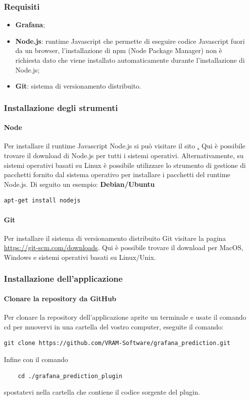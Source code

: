\subsubsection{Requisiti}
\begin{itemize}
	\item \textbf{Grafana\glo};
	\item \textbf{Node.js}: runtime Javascript che permette di eseguire codice Javascript fuori da un browser, l'installazione di npm (Node Package Manager) non è richiesta dato che viene installato automaticamente durante l'installazione di Node.js;
	\item \textbf{Git}: sistema di versionamento distribuito.
\end{itemize}

\subsubsection{Installazione degli strumenti}

\paragraph{Node}
Per installare il runtime Javascript Node.js si può visitare il sito \href{https://nodejs.org}. Qui è possibile trovare il download di Node.js per tutti i sistemi operativi. Alternativamente, su sistemi operativi basati su Linux è possibile utilizzare lo strumento di gestione di pacchetti fornito dal sistema operativo per installare i pacchetti del runtime Node.js. Di seguito un esempio:
\textbf{Debian/Ubuntu} \\
\begin{verbatim}
apt-get install nodejs
\end{verbatim}

\paragraph{Git}
Per installare il sistema di versionamento distribuito Git visitare la pagina \url{https://git-scm.com/downloads}. Qui è possibile trovare il download per MacOS, Windows e sistemi operativi basati su Linux/Unix.

\subsubsection{Installazione dell'applicazione}
\paragraph{Clonare la repository da GitHub}
Per clonare la repository dell'applicazione aprite un terminale e usate il comando cd per muovervi in una cartella del vostro computer, eseguite il comando: 
\begin{verbatim}git clone https://github.com/VRAM-Software/grafana_prediction.git
\end{verbatim}
Infine con il comando 
\begin{verbatim}
	cd ./grafana_prediction_plugin
\end{verbatim}
spostatevi nella cartella che contiene il codice sorgente del plugin.

